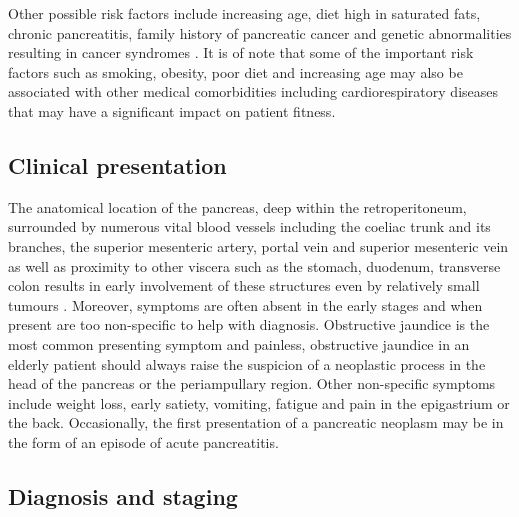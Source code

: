 Other possible risk factors include increasing age, diet high in saturated fats, chronic pancreatitis, family history of pancreatic cancer and genetic abnormalities resulting in cancer syndromes \parencite{raimondi_epidemiology_2009, maisonneuve_epidemiology_2010}.
It is of note that some of the important risk factors such as smoking, obesity, poor diet and increasing age may also be associated with other medical comorbidities including cardiorespiratory diseases that may have a significant impact on patient fitness.

\subsection{Clinical presentation}

The anatomical location of the pancreas, deep within the retroperitoneum, surrounded by numerous vital blood vessels including the coeliac trunk and its branches, the superior mesenteric artery, portal vein and superior mesenteric vein as well as proximity to other viscera such as the stomach, duodenum, transverse colon results in early involvement of these structures even by relatively small tumours \parencite{li_pancreatic_2004}. 
Moreover, symptoms are often absent in the early stages and when present are too non-specific to help with diagnosis. 
Obstructive jaundice is the most common presenting symptom and painless, obstructive jaundice in an elderly patient should always raise the suspicion of a neoplastic process in the head of the pancreas or the periampullary region. 
Other non-specific symptoms include weight loss, early satiety, vomiting, fatigue and pain in the epigastrium or the back. 
Occasionally, the first presentation of a pancreatic neoplasm may be in the form of an episode of acute pancreatitis.
 
\subsection{Diagnosis and staging}

